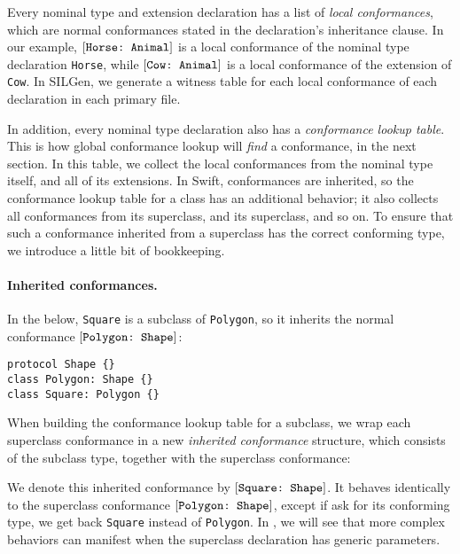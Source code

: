 \documentclass[../generics]{subfiles}
\begin{document}
Every nominal type and extension declaration has a list of \emph{local conformances}, which are normal conformances stated in the declaration's inheritance clause. In our example, $[\texttt{Horse:~Animal}]$ is a local conformance of the nominal type declaration \texttt{Horse}, while $[\texttt{Cow:~Animal}]$ is a local conformance of the extension of \texttt{Cow}. In SILGen, we generate a witness table for each local conformance of each declaration in each primary file.

In addition, every nominal type declaration also has a \emph{conformance lookup table}. This is how global conformance lookup will \emph{find} a conformance, in the next section. In this table, we collect the local conformances from the nominal type itself, and all of its extensions. In Swift, conformances are inherited, so the conformance lookup table for a class has an additional behavior; it also collects all conformances from its superclass, and its superclass, and so on. To ensure that such a conformance inherited from a superclass has the correct conforming type, we introduce a little bit of bookkeeping.

\paragraph{Inherited conformances.}
In the below, \texttt{Square} is a subclass of \texttt{Polygon}, so it inherits the normal conformance $[\texttt{Polygon:~Shape}]$:
\begin{Verbatim}
protocol Shape {}
class Polygon: Shape {}
class Square: Polygon {}
\end{Verbatim}
When building the conformance lookup table for a subclass, we wrap each superclass conformance in a new \emph{inherited conformance} structure, which consists of the subclass type, together with the superclass conformance:
\begin{center}
\end{center}
We denote this inherited conformance by $[\texttt{Square:~Shape}]$. It behaves identically to the superclass conformance $[\texttt{Polygon:~Shape}]$, except if ask for its conforming type, we get back \texttt{Square} instead of \texttt{Polygon}. In , we will see that more complex behaviors can manifest when the superclass declaration has generic parameters.
\end{document}
